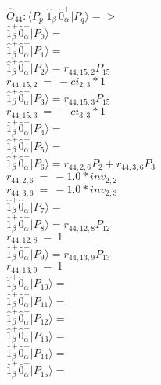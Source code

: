 \documentclass[14pt]{article}
\begin{document}
    $\hat{O}_{44}:  \langle{P_p}\vert \hat{1}_{\beta}^{+}\hat{0}_{\alpha}^{+} \vert{P_q}\rangle => $ \\ 
    $ \hat{1}_{\beta}^{+}\hat{0}_{\alpha}^{+} \vert{P_{0}}\rangle =  $ \\ 
    $ \hat{1}_{\beta}^{+}\hat{0}_{\alpha}^{+} \vert{P_{1}}\rangle =  $ \\ 
    $ \hat{1}_{\beta}^{+}\hat{0}_{\alpha}^{+} \vert{P_{2}}\rangle = {r}_{44,15,2}P_{15} $ \\ 
    ${r}_{44,15,2}\ =\ -{ci}_{2,3}*1 $ \\ 
    $ \hat{1}_{\beta}^{+}\hat{0}_{\alpha}^{+} \vert{P_{3}}\rangle = {r}_{44,15,3}P_{15} $ \\ 
    ${r}_{44,15,3}\ =\ -{ci}_{3,3}*1 $ \\ 
    $ \hat{1}_{\beta}^{+}\hat{0}_{\alpha}^{+} \vert{P_{4}}\rangle =  $ \\ 
    $ \hat{1}_{\beta}^{+}\hat{0}_{\alpha}^{+} \vert{P_{5}}\rangle =  $ \\ 
    $ \hat{1}_{\beta}^{+}\hat{0}_{\alpha}^{+} \vert{P_{6}}\rangle = {r}_{44,2,6}P_{2}+{r}_{44,3,6}P_{3} $ \\ 
    ${r}_{44,2,6}\ =\ -1.0*{inv}_{2,2} $ \\ 
    ${r}_{44,3,6}\ =\ -1.0*{inv}_{2,3} $ \\ 
    $ \hat{1}_{\beta}^{+}\hat{0}_{\alpha}^{+} \vert{P_{7}}\rangle =  $ \\ 
    $ \hat{1}_{\beta}^{+}\hat{0}_{\alpha}^{+} \vert{P_{8}}\rangle = {r}_{44,12,8}P_{12} $ \\ 
    ${r}_{44,12,8}\ =\ 1 $ \\ 
    $ \hat{1}_{\beta}^{+}\hat{0}_{\alpha}^{+} \vert{P_{9}}\rangle = {r}_{44,13,9}P_{13} $ \\ 
    ${r}_{44,13,9}\ =\ 1 $ \\ 
    $ \hat{1}_{\beta}^{+}\hat{0}_{\alpha}^{+} \vert{P_{10}}\rangle =  $ \\ 
    $ \hat{1}_{\beta}^{+}\hat{0}_{\alpha}^{+} \vert{P_{11}}\rangle =  $ \\ 
    $ \hat{1}_{\beta}^{+}\hat{0}_{\alpha}^{+} \vert{P_{12}}\rangle =  $ \\ 
    $ \hat{1}_{\beta}^{+}\hat{0}_{\alpha}^{+} \vert{P_{13}}\rangle =  $ \\ 
    $ \hat{1}_{\beta}^{+}\hat{0}_{\alpha}^{+} \vert{P_{14}}\rangle =  $ \\ 
    $ \hat{1}_{\beta}^{+}\hat{0}_{\alpha}^{+} \vert{P_{15}}\rangle =  $ \\ 
    
\end{document}
